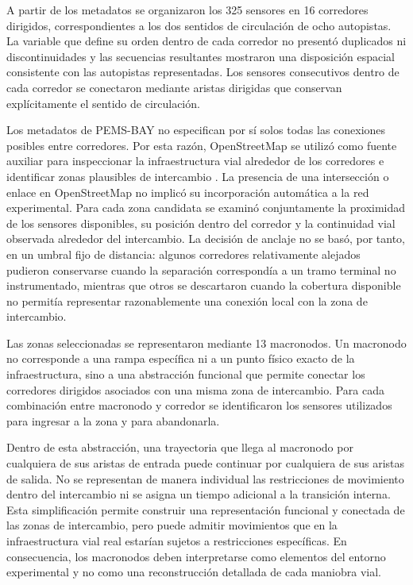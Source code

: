 \documentclass[11pt]{article}
\begin{document}
A partir de los metadatos se organizaron los 325 sensores en 16 corredores dirigidos, correspondientes a los dos sentidos de circulación de ocho autopistas. La variable que define su orden dentro de cada corredor no presentó duplicados ni discontinuidades y las secuencias resultantes mostraron una disposición espacial consistente con las autopistas representadas. Los sensores consecutivos dentro de cada corredor se conectaron mediante aristas dirigidas que conservan explícitamente el sentido de circulación.

Los metadatos de PEMS-BAY no especifican por sí solos todas las conexiones posibles entre corredores. Por esta razón, OpenStreetMap se utilizó como fuente auxiliar para inspeccionar la infraestructura vial alrededor de los corredores e identificar zonas plausibles de intercambio \parencite{openstreetmap}. La presencia de una intersección o enlace en OpenStreetMap no implicó su incorporación automática a la red experimental. Para cada zona candidata se examinó conjuntamente la proximidad de los sensores disponibles, su posición dentro del corredor y la continuidad vial observada alrededor del intercambio. La decisión de anclaje no se basó, por tanto, en un umbral fijo de distancia: algunos corredores relativamente alejados pudieron conservarse cuando la separación correspondía a un tramo terminal no instrumentado, mientras que otros se descartaron cuando la cobertura disponible no permitía representar razonablemente una conexión local con la zona de intercambio.

Las zonas seleccionadas se representaron mediante 13 macronodos. Un macronodo no corresponde a una rampa específica ni a un punto físico exacto de la infraestructura, sino a una abstracción funcional que permite conectar los corredores dirigidos asociados con una misma zona de intercambio. Para cada combinación entre macronodo y corredor se identificaron los sensores utilizados para ingresar a la zona y para abandonarla.

Dentro de esta abstracción, una trayectoria que llega al macronodo por cualquiera de sus aristas de entrada puede continuar por cualquiera de sus aristas de salida. No se representan de manera individual las restricciones de movimiento dentro del intercambio ni se asigna un tiempo adicional a la transición interna. Esta simplificación permite construir una representación funcional y conectada de las zonas de intercambio, pero puede admitir movimientos que en la infraestructura vial real estarían sujetos a restricciones específicas. En consecuencia, los macronodos deben interpretarse como elementos del entorno experimental y no como una reconstrucción detallada de cada maniobra vial.
\end{document}
